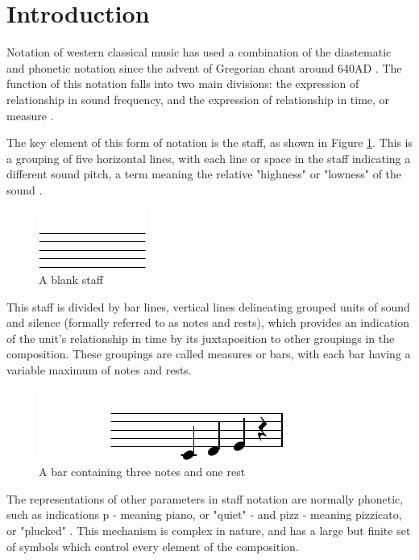 \section{Introduction}
Notation of western classical music has used a combination of the diastematic and phonetic notation \parencite{RRastall} since the advent of Gregorian chant around 640AD \parencite{RTaruskin}. The function of this notation falls into two main divisions: the expression of relationship in sound frequency, and the expression of relationship in time, or measure \parencite{oxHistory}.

The key element of this form of notation is the staff, as shown in Figure \ref{staff}. This is a grouping of five horizontal lines, with each line or space in the staff indicating a different sound pitch, a term meaning the relative "highness" or "lowness" of the sound \parencite{classroom}.

\begin{figure}[h]
    \centering
        \includegraphics{staff-crop.pdf}
    \caption{A blank staff}
    \label{staff}
\end{figure}

This staff is divided by bar lines, vertical lines delineating grouped units of sound and silence (formally referred to as notes and rests), which provides an indication of the unit's relationship in time by its juxtaposition to other groupings in the composition. These groupings are called measures or bars, with each bar having a variable maximum of notes and rests. 

\begin{figure}[h]
    \centering
        \includegraphics{bar_with_notes-crop.pdf}
    \caption{A bar containing three notes and one rest}
    \label{staff-notes}
\end{figure}

The representations of other parameters in staff notation are normally phonetic, such as indications p - meaning piano, or "quiet" - and pizz - meaning pizzicato, or "plucked" \parencite{RRastall}. This mechanism is complex in nature, and has a large but finite set of symbols which control every element of the composition.

